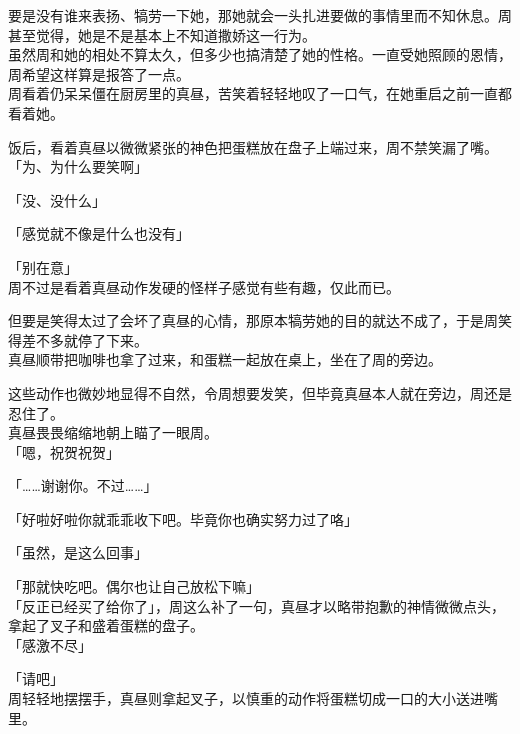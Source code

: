 要是没有谁来表扬、犒劳一下她，那她就会一头扎进要做的事情里而不知休息。周甚至觉得，她是不是基本上不知道撒娇这一行为。\\

虽然周和她的相处不算太久，但多少也搞清楚了她的性格。一直受她照顾的恩情，周希望这样算是报答了一点。\\

周看着仍呆呆僵在厨房里的真昼，苦笑着轻轻地叹了一口气，在她重启之前一直都看着她。\\

\vspace{2\baselineskip}

饭后，看着真昼以微微紧张的神色把蛋糕放在盘子上端过来，周不禁笑漏了嘴。\\

「为、为什么要笑啊」

「没、没什么」

「感觉就不像是什么也没有」

「别在意」\\

周不过是看着真昼动作发硬的怪样子感觉有些有趣，仅此而已。

但要是笑得太过了会坏了真昼的心情，那原本犒劳她的目的就达不成了，于是周笑得差不多就停了下来。\\

真昼顺带把咖啡也拿了过来，和蛋糕一起放在桌上，坐在了周的旁边。

这些动作也微妙地显得不自然，令周想要发笑，但毕竟真昼本人就在旁边，周还是忍住了。\\

真昼畏畏缩缩地朝上瞄了一眼周。\\

「嗯，祝贺祝贺」

「……谢谢你。不过……」

「好啦好啦你就乖乖收下吧。毕竟你也确实努力过了咯」

「虽然，是这么回事」

「那就快吃吧。偶尔也让自己放松下嘛」\\

「反正已经买了给你了」，周这么补了一句，真昼才以略带抱歉的神情微微点头，拿起了叉子和盛着蛋糕的盘子。\\

「感激不尽」

「请吧」\\

周轻轻地摆摆手，真昼则拿起叉子，以慎重的动作将蛋糕切成一口的大小送进嘴里。\\

